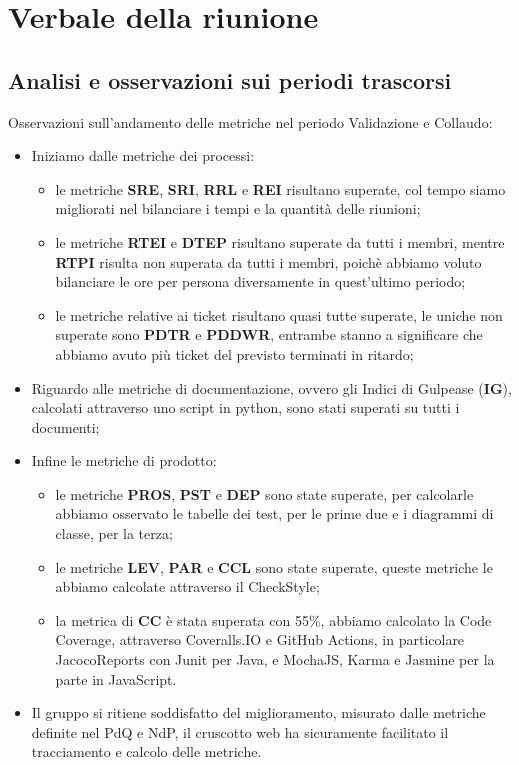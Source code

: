 \section{Verbale della riunione}

\subsection{Analisi e osservazioni sui periodi trascorsi}
Osservazioni sull'andamento delle metriche nel periodo Validazione e Collaudo:
\begin{itemize}
	\item Iniziamo dalle metriche dei processi:
		\begin{itemize}
			\item le metriche \textbf{SRE}, \textbf{SRI}, \textbf{RRL} e \textbf{REI} risultano superate, col tempo siamo migliorati nel bilanciare i tempi e la quantità delle riunioni;
			\item le metriche \textbf{RTEI} e \textbf{DTEP} risultano superate da tutti i membri, mentre \textbf{RTPI} risulta non superata da tutti i membri, poichè abbiamo voluto bilanciare le ore per persona diversamente in quest'ultimo periodo;
			\item le metriche relative ai ticket risultano quasi tutte superate, le uniche non superate sono \textbf{PDTR} e \textbf{PDDWR}, entrambe stanno a significare che abbiamo avuto più ticket del previsto terminati in ritardo;
		\end{itemize}
	\item Riguardo alle metriche di documentazione, ovvero gli Indici di Gulpease (\textbf{IG}), calcolati attraverso uno script in python, sono stati superati su tutti i documenti;
	\item Infine le metriche di prodotto:
		\begin{itemize}
			\item le metriche \textbf{PROS}, \textbf{PST} e \textbf{DEP} sono state superate, per calcolarle abbiamo osservato le tabelle dei test, per le prime due e i diagrammi di classe, per la terza;
			\item le metriche \textbf{LEV}, \textbf{PAR} e \textbf{CCL} sono state superate, queste metriche le abbiamo calcolate attraverso il CheckStyle;
			\item la metrica di \textbf{CC} è stata superata con 55\%, abbiamo calcolato la Code Coverage, attraverso Coveralls.IO e GitHub Actions, in particolare JacocoReports con Junit per Java, e MochaJS, Karma e Jasmine per la parte in JavaScript.
		\end{itemize}
	\item Il gruppo si ritiene soddisfatto del miglioramento, misurato dalle metriche definite nel PdQ e NdP, il cruscotto web ha sicuramente facilitato il tracciamento e calcolo delle metriche.
\end{itemize}


